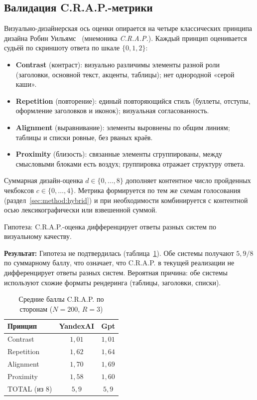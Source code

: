 \subsection{Валидация C.R.A.P.-метрики}
\label{sec:results:crap}

Визуально-дизайнерская ось оценки опирается на четыре
классических принципа дизайна Робин Уильямс~\cite{williams2015nondesigner}
(мнемоника \emph{C.R.A.P.}). Каждый принцип оценивается судьёй
по скриншоту ответа по шкале $\{0, 1, 2\}$:

\begin{itemize}
    \item \textbf{Contrast} (контраст): визуально различимы элементы
        разной роли (заголовки, основной текст, акценты,
        таблицы); нет однородной «серой каши».
    \item \textbf{Repetition} (повторение): единый повторяющийся стиль
        (буллеты, отступы, оформление заголовков и иконок);
        визуальная согласованность.
    \item \textbf{Alignment} (выравнивание): элементы выровнены по общим
        линиям; таблицы и списки ровные, без рваных краёв.
    \item \textbf{Proximity} (близость): связанные элементы
        сгруппированы, между смысловыми блоками есть воздух;
        группировка отражает структуру ответа.
\end{itemize}

Суммарная дизайн-оценка $d \in \{0, \dots, 8\}$ дополняет
контентное число пройденных чекбоксов $c \in \{0, \dots, 4\}$.
Метрика формируется по тем же схемам голосования
(раздел~\ref{sec:method:hybrid}) и при необходимости комбинируется
с контентной осью лексикографически или взвешенной суммой.

Гипотеза: C.R.A.P.-оценка дифференцирует ответы
разных систем по визуальному качеству.

\textbf{Результат:} Гипотеза не подтвердилась (таблица~\ref{tab:crap-results}).
Обе системы получают $5{,}9/8$ по суммарному баллу, что означает,
что C.R.A.P. в текущей реализации не дифференцирует ответы
разных систем. Вероятная причина: обе системы используют схожие
форматы рендеринга (таблицы, заголовки, списки).

\begin{table}[htbp]
    \centering
    \caption{Средние баллы C.R.A.P. по сторонам ($N = 200$, $R = 3$)}
    \label{tab:crap-results}
    \begin{tabular}{lcc}
        \toprule
        Принцип & YandexAI & Gpt \\
        \midrule
        Contrast & $1{,}01$ & $1{,}01$ \\
        Repetition & $1{,}62$ & $1{,}64$ \\
        Alignment & $1{,}70$ & $1{,}69$ \\
        Proximity & $1{,}58$ & $1{,}60$ \\
        \midrule
        TOTAL (из 8) & $5{,}9$ & $5{,}9$ \\
        \bottomrule
    \end{tabular}
\end{table}

